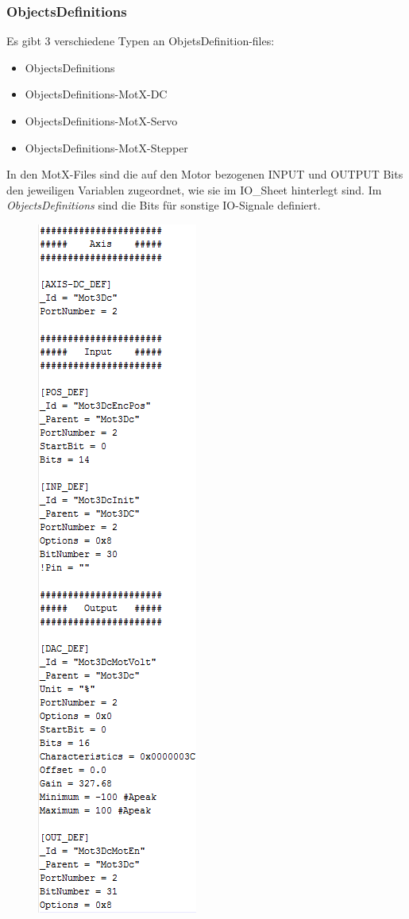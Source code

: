 		\subsubsection{ObjectsDefinitions}
			Es gibt 3 verschiedene Typen an ObjetsDefinition-files:
			\begin{itemize}
				\item ObjectsDefinitions
				\item ObjectsDefinitions-MotX-DC
				\item ObjectsDefinitions-MotX-Servo
				\item ObjectsDefinitions-MotX-Stepper
			\end{itemize}
			In den MotX-Files sind die auf den Motor bezogenen INPUT und OUTPUT Bits den jeweiligen Variablen zugeordnet, wie sie im IO\_Sheet hinterlegt sind. Im \textit{ObjectsDefinitions} sind die Bits für sonstige IO-Signale definiert.
			\begin{figure}[!h]
				\centering
				\includegraphics[width=0.3\linewidth]{./pics/ccp/objectsDefinitionServo.png}
				\caption{}
				\label{}
			\end{figure}


	